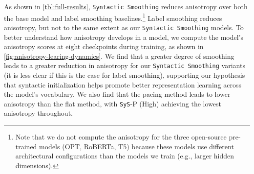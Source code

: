As shown in \cref{tbl:full-results}, \newline \texttt{Syntactic Smoothing} reduces anisotropy over both the base model and label smoothing baselines.\footnote{Note that we do not compute the anisotropy for the three open-source pre-trained models (OPT, RoBERTa, T5) because these models use different architectural configurations than the models we train (e.g., larger hidden dimensions).} Label smoothing reduces anisotropy, but not to the same extent as our \texttt{Syntactic Smoothing} models. To better understand how anisotropy develops in a model, we compute the model's anisotropy scores at eight checkpoints during training, as shown in \cref{fig:anisotropy-learing-dynamics}. We find that a greater degree of smoothing leads to a greater reduction in anisotropy for our \texttt{Syntactic Smoothing} variants (it is less clear if this is the case for label smoothing), supporting our hypothesis that syntactic initialization helps promote better representation learning across the model's vocabulary. We also find that the pacing method leads to lower anisotropy than the flat method, with \texttt{SyS}-P (High) achieving the lowest anisotropy throughout.

